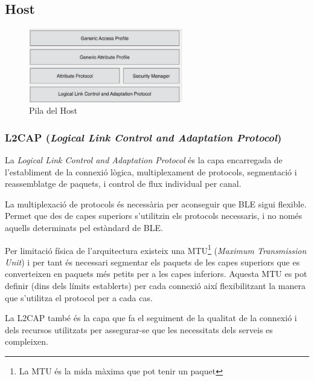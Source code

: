 
\subsection{Host}
	\begin{figure}[h!]
		\begin{center}
			\includegraphics[width=0.6\textwidth]{./images/host.png}
			\caption{Pila del Host}
	\end{center}
\end{figure}

\subsubsection{L2CAP (\textit{Logical Link Control and Adaptation Protocol})}
La \textit{Logical Link Control and Adaptation Protocol} és la capa encarregada de l'establiment de la connexió lògica, multiplexament de protocols, segmentació i reassemblatge de paquets, i control de flux individual per canal.

La multiplexació de protocols és necessària per aconseguir que BLE sigui flexible.
Permet que des de capes superiors s'utilitzin els protocols necessaris, i no només aquells determinats pel estàndard de BLE.

Per limitació física de l'arquitectura existeix una MTU\footnote{La MTU és la mida màxima que pot tenir un paquet} (\textit{Maximum Transmission Unit}) i per tant és necessari segmentar els paquets de les capes superiors que es converteixen en paquets més petits per a les capes inferiors.
Aquesta MTU es pot definir (dins dels límits establerts) per cada connexió així flexibilitzant la manera que s'utilitza el protocol per a cada cas.

La L2CAP també és la capa que fa el seguiment de la qualitat de la connexió i dels recursos utilitzats per assegurar-se que les necessitats dels serveis es compleixen.


